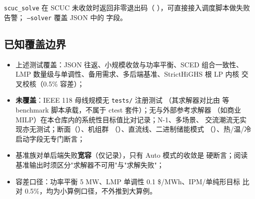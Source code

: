 \texttt{scuc\_solve} 在 SCUC 未收敛时返回非零退出码（
），可直接接入调度脚本做失败告警；
\texttt{--solver} 覆盖 JSON 中的  字段。

\subsection{已知覆盖边界}

\begin{boundarynote}
\begin{itemize}
  \item 上述测试覆盖：JSON 往返、小规模收敛与功率平衡、SCED 组合一致性、
        LMP 数量级与单调性、备用需求、多后端基准、StrictHiGHS 根 LP 内核
        交叉校核（0.5\% 容差）；
  \item \textbf{未覆盖}：IEEE 118 母线规模无 \texttt{tests/} 注册测试
        （其求解器对比由 
        等 benchmark 脚本承载，不属于 ctest 套件）；无与外部参考求解器
        （如商业 MILP）在本仓库内的系统性目标值比对记录；N-1、多场景、
        交流潮流无实现亦无测试；断面（）、机组群
        （）、直流线、二进制储能模式
        （）、热/温/冷启动字段无专门断言；
  \item 基准族对单后端失败\textbf{宽容}（仅记录），只有 Auto 模式的收敛是
        硬断言；阅读基准输出时须区分"求解器不可用"与"求解失败"；
  \item 容差口径：功率平衡 5 MW、LMP 单调性 0.1 \$/MWh、IPM/单纯形目标
        比对 0.5\%，均为小算例口径，不外推到大算例。
\end{itemize}
\end{boundarynote}
